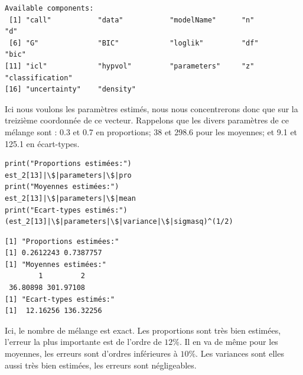 \documentclass[frenchb]{report}
\newcommand{\1}{\mathbbm{1}}
\theoremstyle{definition}\newtheorem{defn}{Définition}
\theoremstyle{definition}\newtheorem{exm}{Exemple}
\theoremstyle{definition}\newtheorem{nota}{Notation}
\theoremstyle{definition}\newtheorem{rem}{Remarque}
\begin{document}
\begin{appendices}
\begin{verbatim}
Available components: 
 [1] "call"           "data"           "modelName"      "n"              "d"             
 [6] "G"              "BIC"            "loglik"         "df"             "bic"           
[11] "icl"            "hypvol"         "parameters"     "z"              "classification"
[16] "uncertainty"    "density"
\end{verbatim}
%
Ici nous voulons les paramètres estimés, nous nous concentrerons donc que sur la treizième coordonnée de ce vecteur.\newline
Rappelons que les divers paramètres de ce mélange sont : 0.3 et 0.7 en proportions; 38 et 298.6 pour les moyennes; et 9.1 et 125.1 en écart-types.
\begin{lstlisting}
print("Proportions estimées:")
est_2[13]|\$|parameters|\$|pro
print("Moyennes estimées:")
est_2[13]|\$|parameters|\$|mean
print("Ecart-types estimés:")
(est_2[13]|\$|parameters|\$|variance|\$|sigmasq)^(1/2)
\end{lstlisting}
\begin{verbatim}
[1] "Proportions estimées:"
[1] 0.2612243 0.7387757
[1] "Moyennes estimées:"
        1         2 
 36.80898 301.97108 
[1] "Ecart-types estimés:"
[1]  12.16256 136.32256
\end{verbatim}
Ici, le nombre de mélange est exact. Les proportions sont très bien estimées, l'erreur la plus importante est de l'ordre de $12\%$. Il en va de même pour les moyennes, les erreurs sont d'ordres inférieures à $10\%$. Les variances sont elles aussi très bien estimées, les erreurs sont négligeables.
\newpage

\end{appendices}
\end{document}
